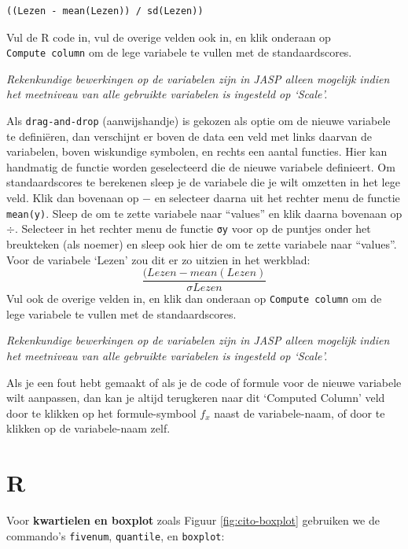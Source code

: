 \documentclass[
]{book}
\newenvironment{Shaded}{\begin{snugshade}}{\end{snugshade}}
\newcommand{\CommentTok}[1]{\textcolor[rgb]{0.56,0.35,0.01}{\textit{#1}}}
\newcommand{\FunctionTok}[1]{\textcolor[rgb]{0.13,0.29,0.53}{\textbf{#1}}}
\newcommand{\NormalTok}[1]{#1}
\newcommand{\OtherTok}[1]{\textcolor[rgb]{0.56,0.35,0.01}{#1}}
\newcommand{\SpecialCharTok}[1]{\textcolor[rgb]{0.81,0.36,0.00}{\textbf{#1}}}
\newcommand{\StringTok}[1]{\textcolor[rgb]{0.31,0.60,0.02}{#1}}
\begin{document}
\begin{verbatim}
((Lezen - mean(Lezen)) / sd(Lezen))
\end{verbatim}

Vul de R code in, vul de overige velden ook in, en klik onderaan op \texttt{Compute\ column} om de lege variabele te vullen met de standaardscores.

\emph{Rekenkundige bewerkingen op de variabelen zijn in JASP alleen mogelijk indien het meetniveau van alle gebruikte variabelen is ingesteld op `Scale'.}

Als \texttt{drag-and-drop} (aanwijshandje) is gekozen als optie om de nieuwe variabele te definiëren, dan verschijnt er boven de data een veld met links daarvan de variabelen, boven wiskundige symbolen, en rechts een aantal functies. Hier kan handmatig de functie worden geselecteerd die de nieuwe variabele definieert. Om standaardscores te berekenen sleep je de variabele die je wilt omzetten in het lege veld. Klik dan bovenaan op \(-\) en selecteer daarna uit het rechter menu de functie \texttt{mean(y)}. Sleep de om te zette variabele naar ``values'' en klik daarna bovenaan op \(\div\). Selecteer in het rechter menu de functie \texttt{σy} voor op de puntjes onder het breukteken (als noemer) en sleep ook hier de om te zette variabele naar ``values''. Voor de variabele `Lezen' zou dit er zo uitzien in het werkblad: \[\frac{(Lezen-mean(Lezen)}{\sigma Lezen}\]
Vul ook de overige velden in, en klik dan onderaan op \texttt{Compute\ column} om de lege variabele te vullen met de standaardscores.

\emph{Rekenkundige bewerkingen op de variabelen zijn in JASP alleen mogelijk indien het meetniveau van alle gebruikte variabelen is ingesteld op `Scale'.}

Als je een fout hebt gemaakt of als je de code of formule voor de nieuwe variabele wilt aanpassen, dan kan je altijd terugkeren naar dit `Computed Column' veld door te klikken op het formule-symbool \(f_x\) naast de variabele-naam, of door te klikken op de variabele-naam zelf.

\section{R}\label{r-3}

Voor \textbf{kwartielen en boxplot} zoals Figuur \ref{fig:cito-boxplot} gebruiken we de commando's \texttt{fivenum}, \texttt{quantile}, en \texttt{boxplot}:

\begin{Shaded}
\end{Shaded}
\end{document}
